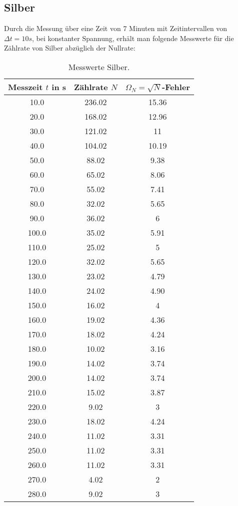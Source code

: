 \subsection{Silber}
\label{sec:silber}

Durch die Messung über eine Zeit von 7 Minuten mit Zeitintervallen von $\Delta t = 10s$, bei konstanter Spannung, erhält man folgende Messwerte für die Zählrate von Silber abzüglich der Nullrate:

\begin{table}
  \centering
  \caption{Messwerte Silber.}
  \label{tab:N2}
\begin{tabular}{c c c}
  \toprule
  Messzeit $t$ in s & Zählrate $N$ & $\Omega_N = \sqrt{N}$-Fehler\\
  \midrule
  10.0 & 236.02 & 15.36 \\
  20.0 & 168.02 & 12.96 \\
  30.0 & 121.02 & 11 \\
  40.0 & 104.02 & 10.19 \\
  50.0 & 88.02 & 9.38  \\
  60.0 & 65.02 & 8.06  \\
  70.0 & 55.02 & 7.41  \\
  80.0 & 32.02 & 5.65  \\
  90.0 & 36.02 & 6  \\
  100.0 & 35.02 & 5.91  \\
  110.0 & 25.02 & 5  \\
  120.0 & 32.02 & 5.65  \\
  130.0 & 23.02 & 4.79  \\
  140.0 & 24.02 & 4.90  \\
  150.0 & 16.02 & 4 \\
  160.0 & 19.02 & 4.36  \\
  170.0 & 18.02 & 4.24  \\
  180.0 & 10.02 & 3.16  \\
  190.0 & 14.02 & 3.74  \\
  200.0 & 14.02 & 3.74  \\
  210.0 & 15.02 & 3.87  \\
  220.0 & 9.02 & 3  \\
  230.0 & 18.02 & 4.24  \\
  240.0 & 11.02 & 3.31  \\
  250.0 & 11.02 & 3.31  \\
  260.0 & 11.02 & 3.31  \\
  270.0 & 4.02 & 2  \\
  280.0 & 9.02 & 3  \\

\end{tabular}
\end{table}
